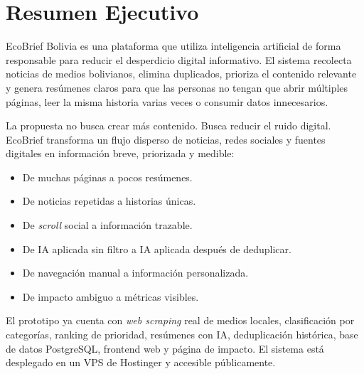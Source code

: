 \chapter*{Resumen Ejecutivo}

EcoBrief Bolivia es una plataforma que utiliza inteligencia artificial de forma responsable para reducir el desperdicio digital informativo. El sistema recolecta noticias de medios bolivianos, elimina duplicados, prioriza el contenido relevante y genera res\'umenes claros para que las personas no tengan que abrir m\'ultiples p\'aginas, leer la misma historia varias veces o consumir datos innecesarios.

La propuesta no busca crear m\'as contenido. Busca reducir el ruido digital. EcoBrief transforma un flujo disperso de noticias, redes sociales y fuentes digitales en informaci\'on breve, priorizada y medible:

\begin{itemize}[nosep]
    \item De muchas p\'aginas a pocos res\'umenes.
    \item De noticias repetidas a historias \'unicas.
    \item De \textit{scroll} social a informaci\'on trazable.
    \item De IA aplicada sin filtro a IA aplicada despu\'es de deduplicar.
    \item De navegaci\'on manual a informaci\'on personalizada.
    \item De impacto ambiguo a m\'etricas visibles.
\end{itemize}

El prototipo ya cuenta con \textit{web scraping} real de medios locales, clasificaci\'on por categor\'ias, ranking de prioridad, res\'umenes con IA, deduplicaci\'on hist\'orica, base de datos PostgreSQL, frontend web y p\'agina de impacto. El sistema est\'a desplegado en un VPS de Hostinger y accesible p\'ublicamente.

\begin{center}
\end{center}

